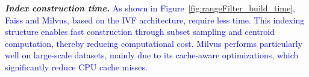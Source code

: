 \documentclass[sigconf, nonacm]{acmart}
\begin{document}
{	\textit{\textbf{Index construction time.}}
%
%	
	\textcolor{blue}{
	As shown in Figure~\ref{fig:rangeFilter_build_time}, Faiss and Milvus, based on the IVF architecture, require less time. This indexing structure enables fast construction through subset sampling and centroid computation, thereby reducing computational cost. Milvus performs particularly well on large-scale datasets, mainly due to its cache-aware optimizations, which significantly reduce CPU cache misses.}

}
\end{document}
